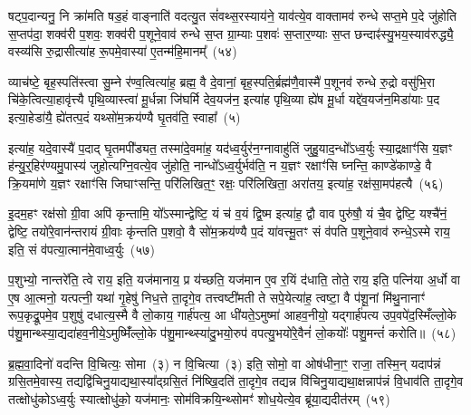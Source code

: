 षट्प॒दान्यनु॒ नि क्रा॑मति षड॒हं वाङ्नाति॑ वदत्यु॒त सं॑वथ्स॒रस्याय॑ने॒ याव॑त्ये॒व वाक्तामव॑ रुन्धे सप्त॒मे प॒दे जु॑होति स॒प्तप॑दा॒ शक्व॑री प॒शवः॒ शक्व॑री प॒शूने॒वाव॑ रुन्धे स॒प्त ग्रा॒म्याः प॒शवः॑ स॒प्तार॒ण्याः स॒प्त छन्दाꣴ॑स्यु॒भय॒स्याव॑रुद्ध्यै॒ वस्व्य॑सि रु॒द्रासीत्या॑ह रू॒पमे॒वास्या॑ ए॒तन्म॑हि॒मानम्᳚~(५४)

व्याच॑ष्टे॒ बृह॒स्पति॑स्त्वा सु॒म्ने र॑ण्व॒त्वित्या॑ह॒ ब्रह्म॒ वै दे॒वानां॒ बृह॒स्पति॒र्ब्रह्म॑णै॒वास्मै॑ प॒शूनव॑ रुन्धे रु॒द्रो वसु॑भि॒रा चि॑के॒त्वित्या॒हावृ॑त्त्यै पृथि॒व्यास्त्वा॑ मू॒र्धन्ना जि॑घर्मि देव॒यज॑न॒ इत्या॑ह पृथि॒व्या ह्ये॑ष मू॒र्धा यद्दे॑व॒यज॑न॒मिडा॑याः प॒द इत्या॒हेडा॑यै॒ ह्ये॑तत्प॒दं यथ्सो॑म॒क्रय॑ण्यै घृ॒तव॑ति॒ स्वाहा᳚~(५)

इत्या॑ह॒ यदे॒वास्यै॑ प॒दाद् घृ॒तमपी᳚ड्यत॒ तस्मा॑दे॒वमा॑ह॒ यद॑ध्व॒र्युर॑न॒ग्नावाहु॑तिं जुहु॒याद॒न्धो᳚\-ऽध्व॒र्युः स्या॒द्रक्षाꣳ॑सि य॒ज्ञꣳ ह॑न्यु॒र्॒\mbox{}हिर॑ण्यमु॒पास्य॑ जुहोत्यग्नि॒वत्ये॒व जु॑होति॒ नान्धो᳚\-ऽध्व॒र्युर्भव॑ति॒ न य॒ज्ञꣳ रक्षाꣳ॑सि घ्नन्ति॒ काण्डे॑काण्डे॒ वै क्रि॒यमा॑णे य॒ज्ञꣳ रक्षाꣳ॑सि जिघाꣳसन्ति॒ परि॑लिखित॒ꣳ॒ रक्षः॒ परि॑लिखिता॒ अरा॑तय॒ इत्या॑ह॒ रक्ष॑सा॒मप॑हत्यै~(५६)

इ॒दम॒हꣳ रक्ष॑सो ग्री॒वा अपि॑ कृन्तामि॒ यो᳚\-ऽस्मान्द्वेष्टि॒ यं च॑ व॒यं द्वि॒ष्म इत्या॑ह॒ द्वौ वाव पुरु॑षौ॒ यं चै॒व द्वेष्टि॒ यश्चै॑नं॒ द्वेष्टि॒ तयो॑रे॒वान॑न्तरायं ग्री॒वाः कृ॑न्तति प॒शवो॒ वै सो॑म॒क्रय॑ण्यै प॒दं या॑वत्त्मू॒तꣳ सं व॑पति प॒शूने॒वाव॑ रुन्धे॒\-ऽस्मे राय॒ इति॒ सं व॑पत्या॒त्मान॑मे॒वाध्व॒र्युः~(५७)

प॒शुभ्यो॒ नान्तरे॑ति॒ त्वे राय॒ इति॒ यज॑मानाय॒ प्र य॑च्छति॒ यज॑मान ए॒व र॒यिं द॑धाति॒ तोते॒ राय॒ इति॒ पत्नि॑या अ॒र्धो वा ए॒ष आ॒त्मनो॒ यत्पत्नी॒ यथा॑ गृ॒हेषु॑ निध॒त्ते ता॒दृगे॒व तत्त्वष्टी॑मती ते सपे॒येत्या॑ह॒ त्वष्टा॒ वै प॑शू॒नां मि॑थु॒नानाꣳ॑ रूप॒कृद्रू॒पमे॒व प॒शुषु॑ दधात्य॒स्मै वै लो॒काय॒ गार्\mbox{}ह॑पत्य॒ आ धी॑यते॒\-ऽमुष्मा॑ आहव॒नीयो॒ यद्गार्\mbox{}ह॑पत्य उप॒वपे॑द॒स्मिँल्लो॒के प॑शु॒मान्थ्स्या॒द्यदा॑हव॒नीये॒\-ऽमुष्मिँ॑ल्लो॒के प॑शु॒मान्थ्स्या॑दु॒भयो॒रुप॑ वपत्यु॒भयो॑रे॒वैनं॑ लो॒कयोः᳚ पशु॒मन्तं॑ करोति॥~(५८)

{\anuvakamend[{म॒हि॒मान॒ꣴ॒ स्वाहाप॑हत्या अध्व॒र्युर्धी॑यते॒ चतु॑र्विHꣳशतिश्च}]}%

ब्र॒ह्म॒वा॒दिनो॑ वदन्ति वि॒चित्यः॒ सोमा~(३) न वि॒चित्या~(३) इति॒ सोमो॒ वा ओष॑धीना॒ꣳ॒ राजा॒ तस्मि॒न् यदाप॑न्नं ग्रसि॒तमे॒वास्य॒ तद्यद्वि॑चिनु॒याद्यथा॒स्या᳚द्ग्रसि॒तं नि॑ष्खि॒दति॑ ता॒दृगे॒व तद्यन्न वि॑चिनु॒याद्यथा॒क्षन्नाप॑न्नं वि॒धाव॑ति ता॒दृगे॒व तत्क्षोधु॑को\-ऽध्व॒र्युः स्यात्क्षोधु॑को॒ यज॑मानः॒ सोम॑विक्रयि॒न्थ्सोमꣳ॑ शोध॒येत्ये॒व ब्रू॑या॒द्यदीत॑रम्~(५९)

